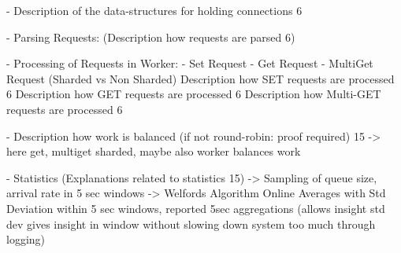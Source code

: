 \documentclass[report.tex]{subfiles}
\begin{document}

- Description of the data-structures for holding connections 6 

- Parsing Requests: 
(Description how requests are parsed 6)

- Processing of Requests in Worker:
- Set Request
- Get Request
- MultiGet Request (Sharded vs Non Sharded)
Description how SET requests are processed 6 Description how GET requests are processed 6 Description how Multi-GET requests are processed 6 

- Description how work is balanced (if not round-robin: proof required) 15 
-> here get, multiget sharded, maybe also worker balances work

- Statistics (Explanations related to statistics 15)
-> Sampling of queue size, arrival rate in 5 sec windows
-> Welfords Algorithm Online Averages with Std Deviation within 5 sec windows, reported 5sec aggregations (allows insight std dev gives insight in window without slowing down system too much through logging)
\end{document}
